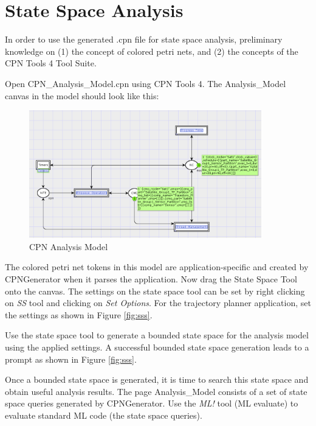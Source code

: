 \chapter{State Space Analysis}

In order to use the generated .cpn file for state space analysis, preliminary knowledge on (1) the concept of colored petri nets, and (2) the concepts of the CPN Tools 4 Tool Suite. 

Open CPN\_Analysis\_Model.cpn using CPN Tools 4. The Analysis\_Model canvas in the model should look like this:

\begin{figure}[ht]
\centering
\includegraphics[width=0.9\textwidth]{./figs/Analysis}
\caption{CPN Analysis Model}
\label{fig:analysis}
\vspace{-0.2in}
\end{figure}
\vspace{0.1in} 

The colored petri net tokens in this model are application-specific and created by CPNGenerator when it parses the application. Now drag the State Space Tool onto the canvas. The settings on the state space tool can be set by right clicking on \emph{SS} tool and clicking on \emph{Set Options}. For the trajectory planner application, set the settings as shown in Figure \ref{fig:sss}.

Use the state space tool to generate a bounded state space for the analysis model using the applied settings. A successful bounded state space generation leads to a prompt as shown in Figure \ref{fig:sss}.

Once a bounded state space is generated, it is time to search this state space and obtain useful analysis results. The page Analysis\_Model consists of a set of state space queries generated by CPNGenerator. Use the \emph{ML!} tool (ML evaluate) to evaluate standard ML code (the state space queries).

